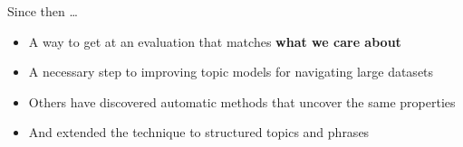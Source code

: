 \documentclass[compress]{beamer}
\begin{document}
\begin{frame}{Since then \dots}

  \begin{itemize}
    \item A way to get at an evaluation that matches {\bf what we care about}
    \item A necessary step to improving topic models for navigating large datasets~\cite{talley-11}
    \item Others have discovered automatic methods that uncover the same properties~\cite{newman-10,mimno-11}
    \item And extended the technique to structured topics and phrases~\cite{lindsey-12,weninger-12}
  \end{itemize}

\end{frame}


\begin{frame}[plain]
\vspace*{-1pt}
\end{frame}
\end{document}
